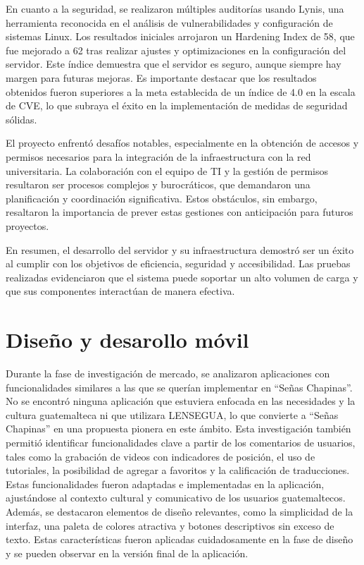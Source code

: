 En cuanto a la seguridad, se realizaron múltiples auditorías usando Lynis, una herramienta reconocida en el análisis de vulnerabilidades y configuración de sistemas Linux. Los resultados iniciales arrojaron un Hardening Index de 58, que fue mejorado a 62 tras realizar ajustes y optimizaciones en la configuración del servidor. Este índice demuestra que el servidor es seguro, aunque siempre hay margen para futuras mejoras. Es importante destacar que los resultados obtenidos fueron superiores a la meta establecida de un índice de 4.0 en la escala de CVE, lo que subraya el éxito en la implementación de medidas de seguridad sólidas.

El proyecto enfrentó desafíos notables, especialmente en la obtención de accesos y permisos necesarios para la integración de la infraestructura con la red universitaria. La colaboración con el equipo de TI y la gestión de permisos resultaron ser procesos complejos y burocráticos, que demandaron una planificación y coordinación significativa. Estos obstáculos, sin embargo, resaltaron la importancia de prever estas gestiones con anticipación para futuros proyectos.

En resumen, el desarrollo del servidor y su infraestructura demostró ser un éxito al cumplir con los objetivos de eficiencia, seguridad y accesibilidad. Las pruebas realizadas evidenciaron que el sistema puede soportar un alto volumen de carga y que sus componentes interactúan de manera efectiva. 






\section{Diseño y desarollo móvil}

Durante la fase de investigación de mercado, se analizaron aplicaciones con funcionalidades similares a las que se querían implementar en ``Señas Chapinas''. No se encontró ninguna aplicación que estuviera enfocada en las necesidades y la cultura guatemalteca ni que utilizara LENSEGUA, lo que convierte a ``Señas Chapinas'' en una propuesta pionera en este ámbito. Esta investigación también permitió identificar funcionalidades clave a partir de los comentarios de usuarios, tales como la grabación de videos con indicadores de posición, el uso de tutoriales, la posibilidad de agregar a favoritos y la calificación de traducciones. Estas funcionalidades fueron adaptadas e implementadas en la aplicación, ajustándose al contexto cultural y comunicativo de los usuarios guatemaltecos. Además, se destacaron elementos de diseño relevantes, como la simplicidad de la interfaz, una paleta de colores atractiva y botones descriptivos sin exceso de texto. Estas características fueron aplicadas cuidadosamente en la fase de diseño y se pueden observar en la versión final de la aplicación.

